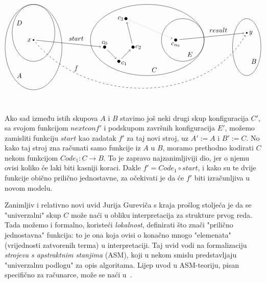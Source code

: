 \begin{equation}\label{dia:alg}
\begin{tikzpicture}[scale=0.75,baseline=(c0)]
\draw (0,0) ellipse (2 and 3);
\draw (8,0.5) ellipse (4 and 2.5);
\draw (15,0) ellipse (1 and 2);
\draw (0,1) ellipse (1.5 and 2);
\draw (10.5,0.5) circle (1.5);
\draw[fill] (0,0.5) coordinate (x) circle (0.05) node[left]{$x$};
\node at(-1,1.7) {$D$};
\node at(-1,-2) {$A$};
\node at(8.5,-1.6) {$C$};
\node at(11,-0.5) {$E$};
\node at(15.5,-1) {$B$};
\node at(3,0.6) {$start$};
\node at(13,1.2) {$result$};
\node at(3,-1.5) {$f$};
\draw[fill] (5,0) coordinate (c0) circle (0.1) node[above]{$c_0$};
\draw[fill] (6,-1) coordinate (c1) circle (0.1) node[right,yshift=-3]{$c_1$};
\draw[fill] (7,0) coordinate (c2) circle (0.1) node[right]{$c_2$};
\draw[fill] (6.5,2) coordinate (c3) circle (0.1) node[left]{$c_3$};
\draw[fill] (10,0.5) coordinate (cn0) circle (0.1) node[below]{$c_{n_0}$};
\draw[fill] (15,1) coordinate (y) circle (0.05) node[right]{$y$};
\draw[shorten <=1.5mm,shorten >=2mm,->] (x) -- (c0);
\draw[shorten <=2mm,shorten >=2mm,->] (c0) -- (c1);
\draw[shorten <=2mm,shorten >=2mm,->] (c1) -- (c2);
\draw[shorten <=2mm,shorten >=2mm,->] (c2) -- (c3);
\draw[dotted,shorten <=2mm,shorten >=2mm,->] (c3) -- (cn0);
\draw[shorten <=2mm,shorten >=1.5mm,->] (cn0) -- (y);
\draw[shorten <=1.5mm, shorten >=1.5mm,dashed,->] (x) to[in=240,out=-50] (y);
\end{tikzpicture}    
\end{equation}


Ako sad između istih skupova $A$ i $B$ stavimo još neki drugi skup konfiguracija $C'$, sa svojom funkcijom $nextconf'$ i podskupom završnih konfiguracija $E'$, možemo zamisliti funkciju $start$ kao zadatak $f'$ za taj novi stroj, uz $A':=A$ i $B':=C$. No kako taj stroj zna računati samo funkcije iz $A$ u $B$, moramo prethodno kodirati $C$ nekom funkcijom $Code_1:C\to B$. To je zapravo najzanimljiviji dio, jer o njemu ovisi koliko će laki biti kasniji koraci. Dakle $f'=Code_1\circ start$, i kako su te dvije funkcije obično prilično jednostavne, za očekivati je da će $f'$ biti izračunljiva u novom modelu.

\begin{napomena}[{name=[strojevi s apstraktnim stanjima]}]\label{nap:ASM}
Zanimljiv i relativno novi uvid Jurija Gureviča s kraja prošlog stoljeća je da se "univerzalni" skup $C$ može naći u obliku interpretacija za strukture prvog reda. Tada možemo i formalno, koristeći \emph{lokalnost}, definirati što znači "prilično jednostavna" funkcija: to je ona koja ovisi o konačno mnogo "elemenata" (vrijednosti zatvorenih terma) u interpretaciji. Taj uvid vodi na formalizaciju \emph{strojeva s apstraktnim stanjima} (ASM), koji u nekom smislu predstavljaju "univerzalnu podlogu" za opis algoritama. Lijep uvod u ASM-teoriju, pisan specifično za računarce, može se naći u~\cite{huggins}.
\end{napomena}

